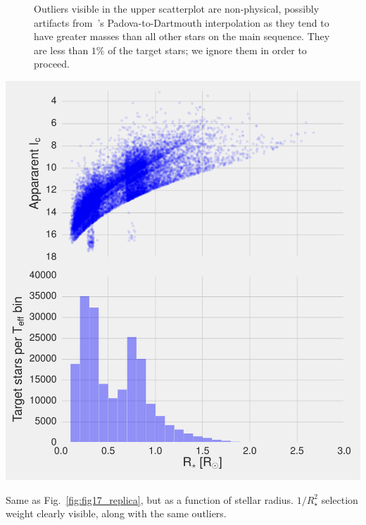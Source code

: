 \begin{figure}[!th]
{	Outliers visible in the upper scatterplot are non-physical,
        possibly artifacts from~'s
        Padova-to-Dartmouth interpolation as they tend to have greater
        masses than all other stars on the main sequence. They are
        less than $1\%$ of the target stars; we ignore them in order
        to proceed.
	}
\end{figure}
\begin{marginfigure}[0in]
	\includegraphics{figures/fig17_radius_on_x.pdf}
	\label{fig:fig17_radius_on_x}
	\caption{Same as Fig.~\protect\ref{fig:fig17_replica}, but as a function of stellar radius. $1/R_\star^2$ selection weight clearly visible, along with the same outliers.
	}
\end{marginfigure}

